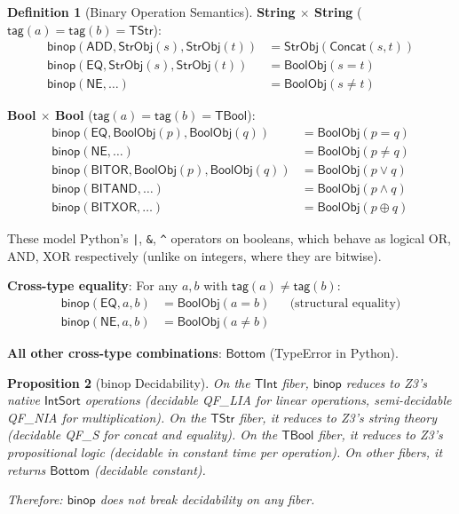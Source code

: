 \documentclass[11pt,a4paper]{report}
\theoremstyle{definition}
\newtheorem{definition}{Definition}[chapter]
\theoremstyle{plain}
\newtheorem{proposition}[definition]{Proposition}
\begin{document}
\begin{definition}[Binary Operation Semantics]
\textbf{String $\times$ String} ($\mathsf{tag}(a) = \mathsf{tag}(b)
= \mathsf{TStr}$):
\begin{align}
  \mathsf{binop}(\mathsf{ADD}, \mathsf{StrObj}(s),
    \mathsf{StrObj}(t)) &= \mathsf{StrObj}(\mathsf{Concat}(s, t)) \\
  \mathsf{binop}(\mathsf{EQ}, \mathsf{StrObj}(s),
    \mathsf{StrObj}(t)) &= \mathsf{BoolObj}(s = t) \\
  \mathsf{binop}(\mathsf{NE}, \ldots) &= \mathsf{BoolObj}(s \neq t)
\end{align}

\textbf{Bool $\times$ Bool} ($\mathsf{tag}(a) = \mathsf{tag}(b)
= \mathsf{TBool}$):
\begin{align}
  \mathsf{binop}(\mathsf{EQ}, \mathsf{BoolObj}(p),
    \mathsf{BoolObj}(q)) &= \mathsf{BoolObj}(p = q) \\
  \mathsf{binop}(\mathsf{NE}, \ldots) &= \mathsf{BoolObj}(p \neq q) \\
  \mathsf{binop}(\mathsf{BITOR}, \mathsf{BoolObj}(p),
    \mathsf{BoolObj}(q)) &= \mathsf{BoolObj}(p \lor q) \\
  \mathsf{binop}(\mathsf{BITAND}, \ldots) &=
    \mathsf{BoolObj}(p \land q) \\
  \mathsf{binop}(\mathsf{BITXOR}, \ldots) &=
    \mathsf{BoolObj}(p \oplus q)
\end{align}

These model Python's \texttt{|}, \texttt{\&}, \texttt{\^{}} operators
on booleans, which behave as logical OR, AND, XOR respectively
(unlike on integers, where they are bitwise).

\textbf{Cross-type equality}: For any $a, b$ with
$\mathsf{tag}(a) \neq \mathsf{tag}(b)$:
\begin{align}
  \mathsf{binop}(\mathsf{EQ}, a, b) &= \mathsf{BoolObj}(a = b)
    && \text{(structural equality)} \\
  \mathsf{binop}(\mathsf{NE}, a, b) &= \mathsf{BoolObj}(a \neq b)
\end{align}

\textbf{All other cross-type combinations}: $\mathsf{Bottom}$
(TypeError in Python).
\end{definition}

\begin{proposition}[binop Decidability]
\label{prop:binop-decidable}
On the $\mathsf{TInt}$ fiber, $\mathsf{binop}$ reduces to Z3's
native $\mathsf{IntSort}$ operations (decidable QF\_LIA for linear
operations, semi-decidable QF\_NIA for multiplication).
On the $\mathsf{TStr}$ fiber, it reduces to Z3's string theory
(decidable QF\_S for concat and equality).
On the $\mathsf{TBool}$ fiber, it reduces to Z3's propositional
logic (decidable in constant time per operation).
On other fibers, it returns $\mathsf{Bottom}$ (decidable constant).

Therefore: $\mathsf{binop}$ does not break decidability on any
fiber.
\end{proposition}
\end{document}
